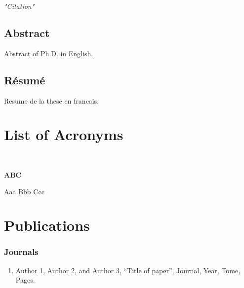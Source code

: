 \documentclass[a4paper, twoside, 12pt]{report}
\begin{document}
	\newpage
	
	\mbox{}
	
	\vspace{220 mm}
	
	\hfill \large \textit{"Citation"}
	
	\newpage
	
	\normalsize
	
	\section*{Abstract}
	
	Abstract of Ph.D. in English.
	
	\section*{R\'esum\'e}
	
	Resume de la these en francais.
	
	\tableofcontents
	
	\listoffigures
	
	
	\listoftables
	
	
	\chapter*{List of Acronyms}
	
	
	$~$
	
	\textbf{ABC} \centerline{Aaa Bbb Ccc}
	
	\chapter*{Publications}
	
	
	
	\subsection*{Journals}
	
	\begin{enumerate}
		\item Author 1, Author 2, and Author 3, “Title of paper”, Journal, Year, Tome, Pages.
	\end{enumerate}
	
\end{document}
